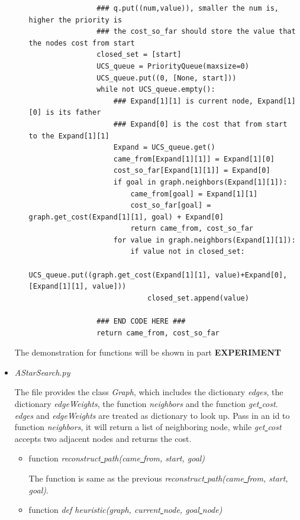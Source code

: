 \documentclass[aps,letterpaper,10pt]{revtex4}
\newcommand{\RNum}[1]{\uppercase\expandafter{\romannumeral #1\relax}}
\begin{document}
\begin{itemize}
\begin{itemize}
\begin{lstlisting}
				### q.put((num,value)), smaller the num is, higher the priority is
				### the cost_so_far should store the value that the nodes cost from start 
				closed_set = [start]
				UCS_queue = PriorityQueue(maxsize=0)
				UCS_queue.put((0, [None, start]))
				while not UCS_queue.empty():
					### Expand[1][1] is current node, Expand[1][0] is its father
					### Expand[0] is the cost that from start to the Expand[1][1]
					Expand = UCS_queue.get()
					came_from[Expand[1][1]] = Expand[1][0]
					cost_so_far[Expand[1][1]] = Expand[0]
					if goal in graph.neighbors(Expand[1][1]):
						came_from[goal] = Expand[1][1]
						cost_so_far[goal] = graph.get_cost(Expand[1][1], goal) + Expand[0]
						return came_from, cost_so_far
					for value in graph.neighbors(Expand[1][1]):
						if value not in closed_set:
							UCS_queue.put((graph.get_cost(Expand[1][1], value)+Expand[0], [Expand[1][1], value]))
							closed_set.append(value)

				### END CODE HERE ###
				return came_from, cost_so_far
		\end{lstlisting}

	\end{itemize}

	The demonstration for functions will be shown in part \textbf{\RNum{2} EXPERIMENT} 

	\item \emph{AStarSearch.py}
	
	The file provides the class \emph{Graph}, which includes the dictionary \emph{edges}, the dictionary \emph{edgeWeights}, the function \emph{neighbors} and the function \emph{get\underline{ }cost}.
	\emph{edges} and \emph{edgeWeights} are treated as dictionary to look up. 
	Pass in an id to function \emph{neighbors}, it will return a list of neighboring node, while \emph{get\underline{ }cost} accepts two adjacent nodes and returns the cost.

	\begin{itemize}
		\item function \emph{reconstruct\underline{ }path(came\underline{ }from, start, goal)}
		
		The function is same as the previous \emph{reconstruct\underline{ }path(came\underline{ }from, start, goal)}.

		\item function \emph{def heuristic(graph, current\underline{ }node, goal\underline{ }node)}
		

\end{itemize}
\end{itemize}
\end{document}
